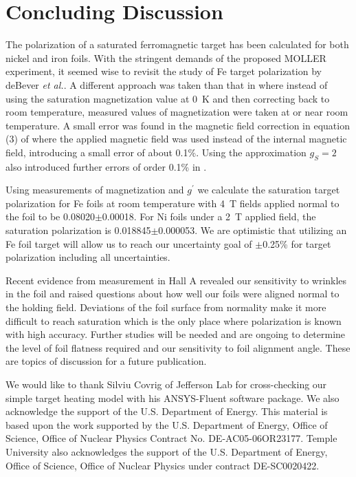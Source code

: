 \documentclass[preprint,12pt]{elsarticle}
\begin{document}
{\section{Concluding Discussion}\label{conclusions}
The polarization of a saturated ferromagnetic target has been calculated for both nickel and iron foils. With the stringent demands of the proposed MOLLER experiment, it seemed wise to revisit the study of Fe target polarization by deBever {\it et al.}\cite{deBever1997}. A different approach was taken than that in \cite{deBever1997} where instead of using the saturation magnetization value at 0~K and then correcting back to room temperature, measured values of magnetization were taken at or near room temperature. A small error was found in the magnetic field correction in equation (3) of \cite{deBever1997} where the applied magnetic field was used instead of the internal magnetic field, introducing a small error of about 0.1\%. Using the approximation $g_S=2$ also introduced further errors of order 0.1\% in \cite{deBever1997}. 

Using measurements of magnetization and $g^\prime$ we calculate the saturation target polarization for Fe  foils at room temperature with 4~T fields applied normal to the foil to be 0.08020$\pm$0.00018. For Ni foils under a 2~T applied field, the saturation polarization is 0.018845$\pm$0.000053. We are optimistic that utilizing an Fe foil target will allow us to reach our uncertainty goal of $\pm$0.25\% for target polarization including all uncertainties.

Recent evidence from measurement in Hall A revealed our sensitivity to wrinkles in the foil and raised questions about how well our foils were aligned normal to the holding field. Deviations of the foil surface from normality make it more difficult to reach saturation which is the only place where polarization is known with high accuracy. Further studies will be needed and are ongoing to determine the level of foil flatness required and our sensitivity to foil alignment angle. These are topics of discussion for a future publication.



We would like to thank Silviu Covrig of Jefferson Lab for cross-checking our simple target heating model with his ANSYS-Fluent software package. We also acknowledge the support of the U.S. Department of Energy. This material is based upon the work supported by the U.S. Department of Energy, Office of Science, Office of Nuclear Physics Contract
No. DE-AC05-06OR23177. Temple University also acknowledges the support of the U.S. Department of Energy, Office of Science, Office of Nuclear Physics under contract  DE-SC0020422.
\FloatBarrier

}
\end{document}
